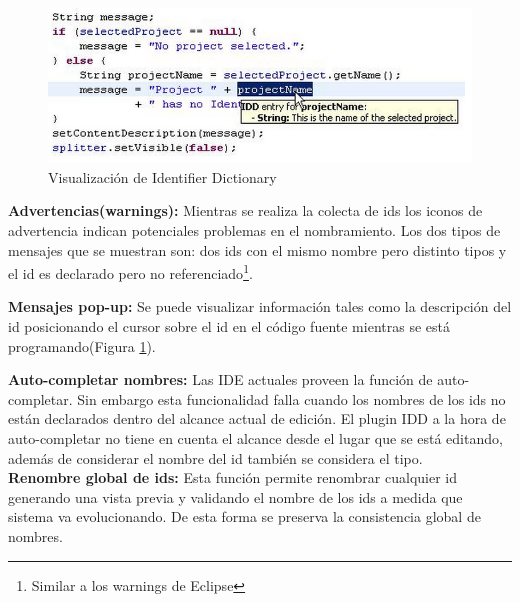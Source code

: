 \documentclass[a4paper,12pt]{report}
\begin{document}
\begin{figure}[t] %
\centerline{%
\includegraphics[scale= 0.70]{./idd_7.png}
}
\caption{Visualización de Identifier Dictionary}
\label{captura8}
\end{figure}

\textbf{Advertencias(warnings):} Mientras se realiza la colecta de ids los iconos de advertencia indican potenciales problemas en el nombramiento.  Los dos tipos de mensajes que se muestran son: dos ids con el mismo nombre pero distinto tipos y el id es declarado pero no referenciado\footnote[1]{Similar a los warnings de Eclipse}.



\textbf{Mensajes pop-up:} Se puede visualizar información tales como la descripción del id posicionando el cursor sobre el id en el código fuente mientras se está programando(Figura \ref{captura8}).

\textbf{Auto-completar nombres:} Las IDE actuales proveen la función de auto-completar. Sin embargo esta funcionalidad falla cuando los nombres de los ids no están declarados dentro del alcance actual de edición. El plugin IDD a la hora de auto-completar no tiene en cuenta el alcance desde el lugar que se está editando, además de considerar el nombre del id también se considera el tipo.\\


\textbf{Renombre global de ids:} Esta función permite renombrar cualquier id generando una vista previa y validando el nombre de los ids a medida que sistema va evolucionando. De esta forma se preserva la consistencia global de nombres.
\end{document}
